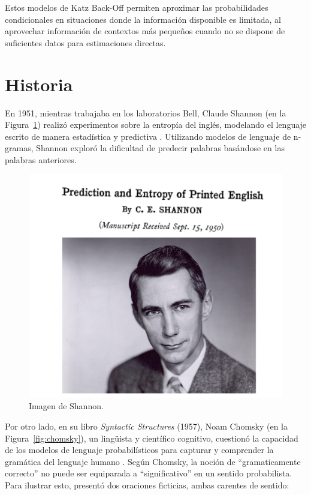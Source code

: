\documentclass[11pt,fleqn]{book} %
\begin{document}
Estos modelos de Katz Back-Off permiten aproximar las probabilidades condicionales en situaciones donde la información disponible es limitada, al aprovechar información de contextos más pequeños cuando no se dispone de suficientes datos para estimaciones directas.

\section{Historia}
En 1951, mientras trabajaba en los laboratorios Bell, Claude Shannon (en la Figura~\ref{fig:shannon}) realizó experimentos sobre la entropía del inglés, modelando el lenguaje escrito de manera estadística y predictiva \cite{shannon1951prediction}. Utilizando modelos de lenguaje de n-gramas, Shannon exploró la dificultad de predecir palabras basándose en las palabras anteriores.

\begin{figure}[h]
    \centering
    \includegraphics[scale = 0.4]{pics/shannon.png}
    \caption{Imagen de Shannon.}
    \label{fig:shannon}
\end{figure}

Por otro lado, en su libro \textit{Syntactic Structures} (1957), Noam Chomsky (en la Figura~\ref{fig:chomsky}), un lingüista y científico cognitivo, cuestionó la capacidad de los modelos de lenguaje probabilísticos para capturar y comprender la gramática del lenguaje humano \cite{chomsky2009syntactic}. Según Chomsky, la noción de ``gramaticamente correcto'' no puede ser equiparada a ``significativo'' en un sentido probabilista. Para ilustrar esto, presentó dos oraciones ficticias, ambas carentes de sentido:
\end{document}
